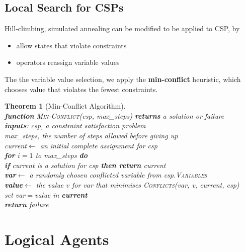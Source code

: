 \documentclass[12pt]{article}
\newcommand{\ind}{\hspace*{15pt}}
\newtheorem{theorem}{Theorem}[section]
\theoremstyle{definition}
\begin{document}
\subsection{Local Search for CSPs}
Hill-climbing, simulated annealing can be modified to be applied to CSP, by
\begin{itemize}
	\item allow states that violate constraints
	\item operators reassign variable values
\end{itemize}
The the variable value selection, we apply the \textbf{min-conflict} heuristic, which chooses value that violates the fewest constraints.
\begin{theorem}[Min-Conflict Algorithm]
\hfill\\\normalfont 
\textbf{function} \textsc{Min-Conflict}(\textit{csp}, \textit{max\_steps}) \textbf{returns} a solution or failure\\
\ind \textbf{inputs}: \textit{csp}, a constraint satisfaction problem\\
\ind \ind \ind \textit{max\_steps}, the number of steps allowed before giving up\\

\ind \textit{current}$\leftarrow$ an initial complete assignment for \textit{csp}\\
\ind \textbf{for} $i=1$ to \textit{max\_steps} \textbf{do}\\
\ind \ind \textbf{if} \textit{current} is a solution for \textit{csp} \textbf{then return} \textit{current}\\
\ind \ind \textbf{var}$\leftarrow$ a randomly chosen conflicted variable from \textit{csp}.\textsc{Variables}\\
\ind \ind \textbf{value}$\leftarrow$ the value $v$ for \textit{var} that minimises \textsc{Conflicts}(\textit{var}, \textit{v}, \textit{current}, \textit{csp})\\
\ind \ind set \textit{var}$=$\textit{value} in \textbf{current}\\
\ind \textbf{return} \textit{failure}
\end{theorem}
\clearpage
\section{Logical Agents}
\end{document}
